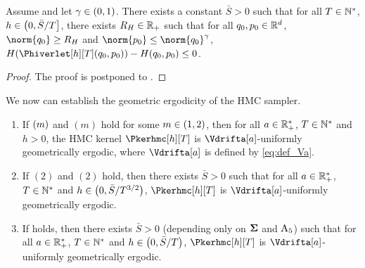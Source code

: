  \begin{proposition}
  \label{propo:accept_pertub} Assume    and let $\gamma \in \left(0,1\right)$.
There exists a  constant $\bar{S} >0$ such that for all $T \in \mathbb{N}^{*}$, $h \in \left(0,\bar{S}/T\right]$, there exists $R_{H} \in \mathbb{R}_+$ such that for
  all $q_0,p_0 \in \mathbb{R}^d$, $\norm{q_0} \geq R_{\Ham}$ and
  $\norm{p_0} \leq \norm{\q_0}^{\gamma}$, $ \Ham(\Phiverlet[h][T](q_0,p_0)) -
  \Ham(q_0,p_0) \leq 0$.
\end{proposition}
\begin{proof}
  The proof is postponed to  .
\end{proof}
We now can establish the geometric ergodicity of the HMC sampler.
\begin{theorem}
  \label{theo:geoErg}
  \begin{enumerate}[label=(\alph*)]
  \item
  \label{item:theo_1}
 If   $(m)$ and  $(m)$ hold for some $m\in (1,2)$, then for all $a \in \mathbb{R}_+^*$,  $T \in \mathbb{N}^*$ and $h > 0$, the HMC kernel $\Pkerhmc[h][T]$ is $\Vdrifta[\a]$-uniformly geometrically ergodic, where $\Vdrifta[a]$ is defined by \eqref{eq:def_Va}.
\item
  \label{item:theo_2}
  If  $(2)$ and $(2)$ hold, then there exists $\bar{S}>0$ such that for all  $a \in \mathbb{R}^*_+$, $T \in \mathbb{N}^*$ and $h \in \left(0,\bar{S}/T^{3/2}\right)$, $\Pkerhmc[h][T]$ is $\Vdrifta[\a]$-uniformly geometrically ergodic.
\item \label{item:theo_3}
  If  holds, then there exists $\bar{S}>0$ (depending only on $\boldsymbol{\Sigma}$ and $\operatorname{A}_5$) such that for all $a \in \mathbb{R}^*_+$, $T \in \mathbb{N}^*$ and $h \in \left(0,\bar{S}/T\right)$, $\Pkerhmc[h][T]$ is $\Vdrifta[\a]$-uniformly geometrically ergodic.
  \end{enumerate}
\end{theorem}
